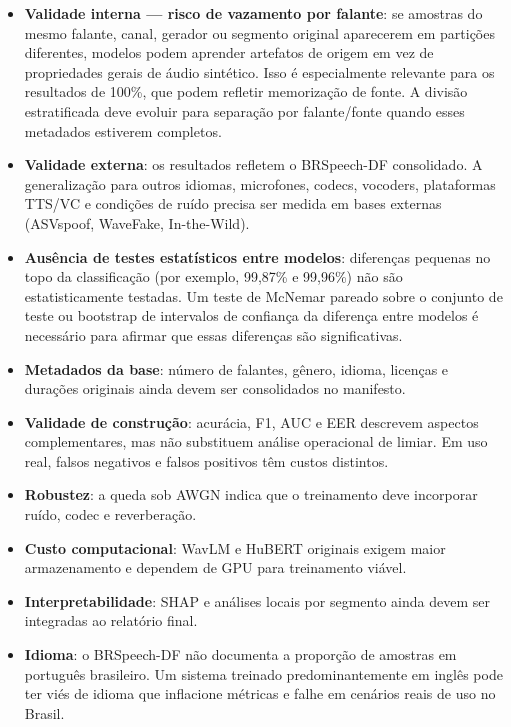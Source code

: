 \documentclass[12pt,a4paper]{article}
\begin{document}
\begin{itemize}
    \item \textbf{Validade interna --- risco de vazamento por falante}:
    se amostras do mesmo falante, canal, gerador ou segmento original
    aparecerem em partições diferentes, modelos podem aprender artefatos de
    origem em vez de propriedades gerais de áudio sintético. Isso é
    especialmente relevante para os resultados de 100\%, que podem refletir
    memorização de fonte. A divisão estratificada deve evoluir para separação
    por falante/fonte quando esses metadados estiverem completos.

    \item \textbf{Validade externa}: os resultados refletem o BRSpeech-DF
    consolidado. A generalização para outros idiomas, microfones, codecs,
    vocoders, plataformas TTS/VC e condições de ruído precisa ser medida em
    bases externas (ASVspoof, WaveFake, In-the-Wild).

    \item \textbf{Ausência de testes estatísticos entre modelos}: diferenças
    pequenas no topo da classificação (por exemplo, 99,87\% e 99,96\%) não são
    estatisticamente testadas. Um teste de McNemar pareado sobre o conjunto de
    teste ou bootstrap de intervalos de confiança da diferença entre modelos é
    necessário para afirmar que essas diferenças são significativas.

    \item \textbf{Metadados da base}: número de falantes, gênero, idioma,
    licenças e durações originais ainda devem ser consolidados no manifesto.

    \item \textbf{Validade de construção}: acurácia, F1, AUC e EER descrevem
    aspectos complementares, mas não substituem análise operacional de limiar.
    Em uso real, falsos negativos e falsos positivos têm custos distintos.

    \item \textbf{Robustez}: a queda sob AWGN indica que o treinamento deve
    incorporar ruído, codec e reverberação.

    \item \textbf{Custo computacional}: WavLM e HuBERT originais exigem maior
    armazenamento e dependem de GPU para treinamento viável.

    \item \textbf{Interpretabilidade}: SHAP e análises locais por segmento
    ainda devem ser integradas ao relatório final.

    \item \textbf{Idioma}: o BRSpeech-DF não documenta a proporção de amostras
    em português brasileiro. Um sistema treinado predominantemente em inglês
    pode ter viés de idioma que inflacione métricas e falhe em cenários reais
    de uso no Brasil.
\end{itemize}
\end{document}
